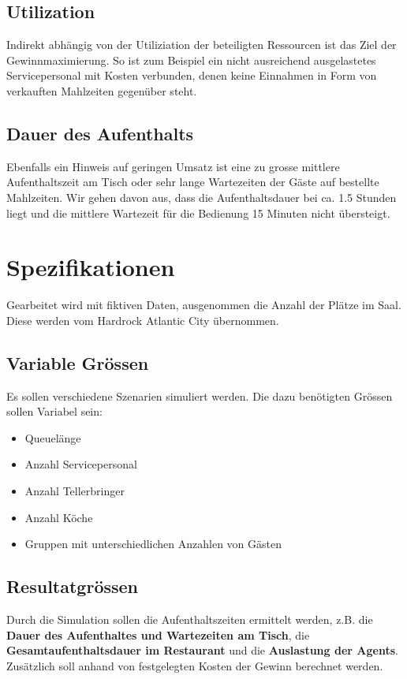 \documentclass[ngerman,a4paper,12pt]{scrreprt}
\begin{document}
	\subsection{Utilization}
	Indirekt abhängig von der Utiliziation der beteiligten Ressourcen ist das Ziel der Gewinnmaximierung. So ist zum Beispiel ein nicht ausreichend ausgelastetes Servicepersonal mit Kosten verbunden, denen keine Einnahmen in Form von verkauften Mahlzeiten gegenüber steht.
	  
	\subsection{Dauer des Aufenthalts}
		Ebenfalls ein Hinweis auf geringen Umsatz ist eine zu grosse mittlere Aufenthaltszeit am Tisch oder sehr lange Wartezeiten der Gäste auf bestellte Mahlzeiten. Wir gehen davon aus, dass die Aufenthaltsdauer bei ca. 1.5 Stunden liegt und die mittlere Wartezeit für die Bedienung 15 Minuten nicht übersteigt.

\section{Spezifikationen}
	Gearbeitet wird mit fiktiven Daten, ausgenommen die Anzahl der Plätze im Saal. Diese werden vom Hardrock Atlantic City übernommen.

	\subsection{Variable Grössen}
		Es sollen verschiedene Szenarien simuliert werden. Die dazu benötigten Grössen sollen Variabel sein:
		\begin{itemize}
			\item Queuelänge
			\item Anzahl Servicepersonal
			\item Anzahl Tellerbringer
			\item Anzahl Köche
			\item Gruppen mit unterschiedlichen Anzahlen von Gästen
		\end{itemize}

	\subsection{Resultatgrössen}
		Durch die Simulation sollen die Aufenthaltszeiten ermittelt werden, z.B. die \textbf{Dauer des Aufenthaltes und Wartezeiten am Tisch}, die \textbf{Gesamtaufenthaltsdauer im Restaurant} und die \textbf{Auslastung der Agents}.
Zusätzlich soll anhand von festgelegten Kosten der Gewinn berechnet werden.
\end{document}
